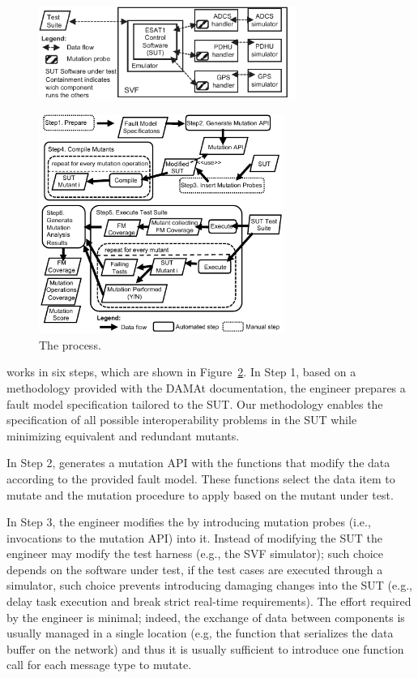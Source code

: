 {\begin{figure}[h]
	\centering
		\includegraphics[width=8.4cm]{damat/images/dataMutationExample}
		\caption{}
		\label{fig:appr:mutateProbesInserted}
	\end{figure}

\begin{figure}[h]
	\centering
		\includegraphics[width=8cm]{damat/images/dataDrivenBufferProcess}
		\caption{The \DAMAT process.}
		\label{fig:appr:approach}
	\end{figure}
	

\DAMAT works in six steps, which are shown in Figure~\ref{fig:appr:approach}. 
In Step 1, based on a methodology provided with the DAMAt documentation, the engineer prepares a fault model specification tailored to the SUT. Our methodology enables the specification of 
all possible interoperability problems in the SUT while minimizing equivalent and redundant mutants.

In Step 2, \DAMAT generates a mutation API with the functions that modify the data according to the provided fault model.
These functions select the data item to mutate and the mutation procedure to apply based on the mutant under test. 

In Step 3, the engineer modifies the  by introducing mutation probes (i.e., invocations to the mutation API) into it.
Instead of modifying the SUT the engineer may modify the test harness (e.g., the SVF simulator); such choice depends on the software under test, if the test cases are executed through a simulator, such choice prevents introducing damaging changes into the SUT (e.g., delay task execution and break strict real-time requirements).
The effort required by the engineer is minimal; indeed, the exchange of data between components is usually managed in a single location (e.g, the function that serializes the data buffer on the network) and thus it is usually sufficient to introduce one function call for each message type to mutate.

}
